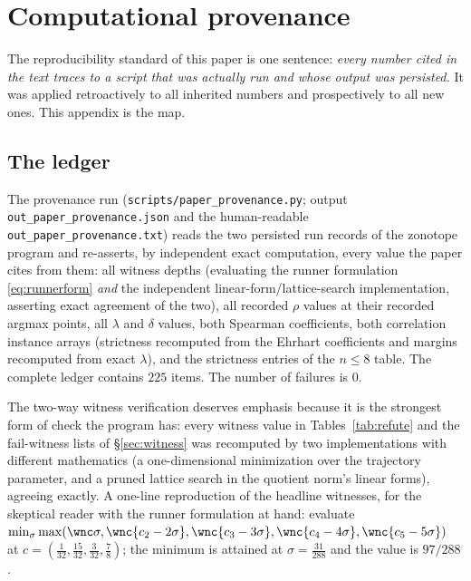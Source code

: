 
\section{Computational provenance}\label{sec:prov}

The reproducibility standard of this paper is one sentence:
\emph{every number cited in the text traces to a script that was
actually run and whose output was persisted.} It was applied
retroactively to all inherited numbers and prospectively to all new
ones. This appendix is the map.

\subsection{The ledger}

The provenance run (\texttt{scripts/paper\_provenance.py}; output
\texttt{out\_paper\_provenance.json} and the human-readable
\texttt{out\_paper\_provenance.txt}) reads the two persisted run records
of the zonotope program and re-asserts, by independent exact
computation, every value the paper cites from them: all witness depths
(evaluating the runner formulation \eqref{eq:runnerform} \emph{and} the
independent linear-form/lattice-search implementation, asserting exact
agreement of the two), all recorded $\rho$ values at their recorded
argmax points, all $\lambda$ and $\delta$ values, both Spearman
coefficients, both correlation instance arrays (strictness recomputed
from the Ehrhart coefficients and margins recomputed from exact
$\lambda$), and the strictness entries of the $n\le8$ table. The
complete ledger contains $225$ items. The number of failures is $0$.

The two-way witness verification deserves emphasis because it is the
strongest form of check the program has: every witness value in
Tables~\ref{tab:refute} and the fail-witness lists of
\S\ref{sec:witness} was recomputed by two implementations with different
mathematics (a one-dimensional minimization over the trajectory
parameter, and a pruned lattice search in the quotient norm's linear
forms), agreeing exactly. A one-line reproduction of the headline
witnesses, for the skeptical reader with the runner formulation at
hand: evaluate
$\min_\sigma\max(\wnc\sigma,\wnc{c_2-2\sigma},\wnc{c_3-3\sigma},
\wnc{c_4-4\sigma},\wnc{c_5-5\sigma})$ at
$c=(\tfrac1{32},\tfrac{15}{32},\tfrac3{32},\tfrac78)$; the minimum is
attained at $\sigma=\tfrac{31}{288}$ and the value is $97/288$.

